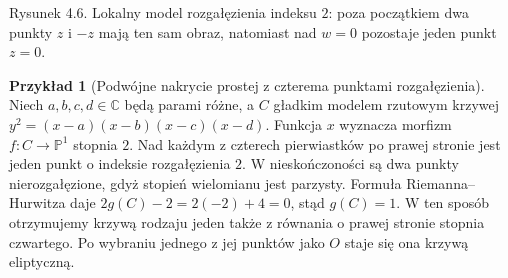 \documentclass[11pt,a4paper,openany]{report}
\numberwithin{equation}{section}
\theoremstyle{plain}
\theoremstyle{definition}
\newtheorem{przyklad}[twierdzenie]{Przykład}
\theoremstyle{remark}
\newcommand{\C}{\mathbb C}
\newcommand{\PP}{\mathbb P}
\begin{document}
\begin{center}
\begin{minipage}{.96\linewidth}
\centering
{}

{\small Rysunek 4.6. Lokalny model rozgałęzienia indeksu $2$:
poza początkiem dwa punkty $z$ i $-z$ mają ten sam obraz,
natomiast nad $w=0$ pozostaje jeden punkt $z=0$.}
\end{minipage}
\end{center}

\begin{przyklad}[Podwójne nakrycie prostej z czterema punktami rozgałęzienia]
Niech $a,b,c,d\in\C$ będą parami różne, a $C$ gładkim
modelem rzutowym krzywej
$y^2=(x-a)(x-b)(x-c)(x-d)$.
Funkcja $x$ wyznacza morfizm $f:C\to\PP^1$ stopnia $2$.
Nad każdym z czterech pierwiastków po prawej stronie
jest jeden punkt o indeksie rozgałęzienia $2$.
W nieskończoności są dwa punkty nierozgałęzione,
gdyż stopień wielomianu jest parzysty.
Formuła Riemanna--Hurwitza daje
$2g(C)-2=2(-2)+4=0$, stąd $g(C)=1$.
W ten sposób otrzymujemy krzywą rodzaju jeden także
z równania o prawej stronie stopnia czwartego.
Po wybraniu jednego z jej punktów jako $O$
staje się ona krzywą eliptyczną.
\end{przyklad}
\end{document}
